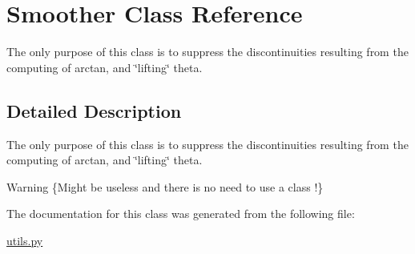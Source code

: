 \hypertarget{classSmoother}{}\section{Smoother Class Reference}
\label{classSmoother}


The only purpose of this class is to suppress the discontinuities resulting from the computing of arctan, and \char`\"{}lifting\char`\"{} theta.  




\subsection{Detailed Description}
The only purpose of this class is to suppress the discontinuities resulting from the computing of arctan, and \char`\"{}lifting\char`\"{} theta. 

\begin{DoxyWarning}{Warning}
\{Might be useless and there is no need to use a class !\} 
\end{DoxyWarning}


The documentation for this class was generated from the following file\+:\begin{DoxyCompactItemize}
\item 
\hyperlink{utils_8py}{utils.\+py}\end{DoxyCompactItemize}
